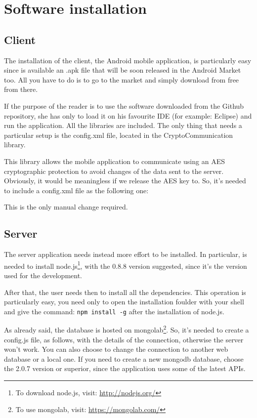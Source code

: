 \appendix
\section{Software installation}
\label{sec:installSoftware}
\subsection{Client}
The installation of the client, the Android mobile application, is particularly easy since is available an .apk file that will be soon released in the Android Market too. All you have to do is to go to the market and simply download from free from there. 

If the purpose of the reader is to use the software downloaded from the Github repository, she has only to load it on his favourite IDE (for example: Eclipse) and run the application. All the libraries are included. The only thing that needs a particular setup is the config.xml file, located in the CryptoCommunication library.

This library allows the mobile application to communicate using an AES cryptographic protection to avoid changes of the data sent to the server. Obviously, it would be meaningless if we release the AES key to. So, it's needed to include a config.xml file as the following one:



This is the only manual change required.
\subsection{Server}

The server application needs instead more effort to be installed. In particular, is needed to install node.js\footnote{To download node.js, visit: \url{http://nodejs.org/}}, with the 0.8.8 version suggested, since it's the version used for the development. 

After that, the user needs then to install all the dependencies. This operation is particularly easy, you need only to open the installation foulder with your shell and give the command: \texttt{npm install -g} after the installation of node.js.

As already said, the database is hosted on mongolab\footnote{To use mongolab, visit: \url{https://mongolab.com/}}. So, it's needed to create a config.js file, as follows, with the details of the connection, otherwise the server won't work. You can also choose to change the connection to another web database or a local one. If you need to create a new mongodb database, choose the 2.0.7 version or superior, since the application uses some of the latest APIs.

